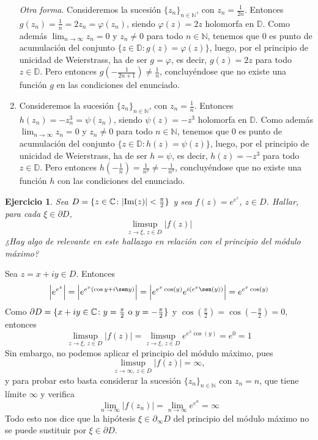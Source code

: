 \documentclass[11pt]{report}
\makeatletter
\renewenvironment{proof}[1][\proofname]{\par
  \pushQED{\qed}%
  \normalfont \topsep\z@skip %
  \trivlist
  \item[\hskip\labelsep
        \itshape
    #1\@addpunct{.}]\ignorespaces
}{%
  \popQED\endtrivlist\@endpefalse
}
\newcommand{\N}{\mathbb N}
\newcommand{\C}{\mathbb C}
\newcommand{\D}{\mathbb D}
\newtheorem{ejercicio}{Ejercicio}
\makeatother
\begin{document}
\begin{proof}
\begin{enumerate}
    \emph{Otra forma}. Consideremos la sucesión $\{z_n\}_{n\in \N}$, con $z_n = \frac{1}{2n}$. Entonces $g(z_n) = \frac{1}{n} = 2z_n = \varphi(z_n)$, siendo $\varphi(z) = 2z$ holomorfa en $\D$. Como además $\lim_{n \to \infty} z_n = 0$ y $z_n \neq 0$ para todo $n \in \N$, tenemos que $0$ es punto de acumulación del conjunto $\{z \in \D \colon g(z)=\varphi(z)\}$, luego, por el principio de unicidad de Weierstrass, ha de ser $g=\varphi$, es decir, $g(z)=2z$ para todo $z \in \D$. Pero entonces $g(-\frac{1}{2n+1}) \neq \frac{1}{n}$, concluyéndose que no existe una función $g$ en las condiciones del enunciado.
  \item Consideremos la sucesión $\{z_n\}_{n\in \N}$, con $z_n = \frac{1}{n}$. Entonces $h(z_n) = -z_n^3 = \psi(z_n)$, siendo $\psi(z) = -z^3$ holomorfa en $\D$. Como además $\lim_{n \to \infty} z_n = 0$ y $z_n \neq 0$ para todo $n \in \N$, tenemos que $0$ es punto de acumulación del conjunto $\{z \in \D \colon h(z)=\psi(z)\}$, luego, por el principio de unicidad de Weierstrass, ha de ser $h=\psi$, es decir, $h(z)=-z^3$ para todo $z \in \D$. Pero entonces $h(-\frac{1}{n}) = \frac{1}{n^3} \neq -\frac{1}{n^3}$, concluyéndose que no existe una función $h$ con las condiciones del enunciado. \qedhere
  \end{enumerate}
\end{proof}

\begin{ejercicio}
  Sea $D = \{z \in \C \colon |\textup{Im}(z)| < \frac{\pi}{2}\}$ y sea $f(z) = e^{e^z}$, $z \in D$. Hallar, para cada $\xi \in \partial D$,
  \[\limsup_{z \to \xi, \, z \in D}|f(z)|\]
  ¿Hay algo de relevante en este hallazgo en relación con el principio del módulo máximo?
\end{ejercicio}

\begin{proof}
Sea $z=x+iy \in D$. Entonces
\[\left|e^{e^z}\right| = \left| e^{e^x(\cos y +i\sen y)} \right|= \left| e^{e^x\cos(y)}e^{i(e^x\sen(y))} \right| = e^{e^x\cos(y)}\]
Como $\partial D = \{x+iy \in \C \colon y = \frac{\pi}{2} \textup{ o } y = -\frac{\pi}{2}\}$ y $\cos(\frac{\pi}{2}) = \cos(-\frac{\pi}{2}) = 0$, entonces
\[\limsup_{z \to \xi, \, z \in D}|f(z)| = \limsup_{z \to \xi, \, z \in D}e^{e^x\cos(y)} = e^0 = 1\]
Sin embargo, no podemos aplicar el principio del módulo máximo, pues
\[\limsup_{z \to \infty, \, z \in D}|f(z)| = \infty,\]
y para probar esto basta considerar la sucesión $\{z_n\}_{n \in \N}$ con $z_n = n$, que tiene límite $\infty$ y verifica
\[\lim_{n \to \infty}|f(z_n)| = \lim_{n \to \infty} e^{e^n} = \infty\]
Todo esto nos dice que la hipótesis $\xi \in \partial_\infty D$ del principio del módulo máximo no se puede sustituir por $\xi \in \partial D$.
\end{proof}
\end{document}

